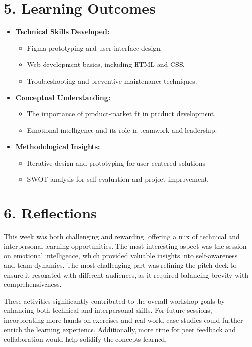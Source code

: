 \documentclass{article}
\begin{document}
\section*{5. Learning Outcomes}
\begin{itemize}
    \item \textbf{Technical Skills Developed:}
    \begin{itemize}
        \item Figma prototyping and user interface design.
        \item Web development basics, including HTML and CSS.
        \item Troubleshooting and preventive maintenance techniques.
    \end{itemize}
    \item \textbf{Conceptual Understanding:}
    \begin{itemize}
        \item The importance of product-market fit in product development.
        \item Emotional intelligence and its role in teamwork and leadership.
    \end{itemize}
    \item \textbf{Methodological Insights:}
    \begin{itemize}
        \item Iterative design and prototyping for user-centered solutions.
        \item SWOT analysis for self-evaluation and project improvement.
    \end{itemize}
\end{itemize}

\section*{6. Reflections}
This week was both challenging and rewarding, offering a mix of technical and interpersonal learning opportunities. The most interesting aspect was the session on emotional intelligence, which provided valuable insights into self-awareness and team dynamics. The most challenging part was refining the pitch deck to ensure it resonated with different audiences, as it required balancing brevity with comprehensiveness.

These activities significantly contributed to the overall workshop goals by enhancing both technical and interpersonal skills. For future sessions, incorporating more hands-on exercises and real-world case studies could further enrich the learning experience. Additionally, more time for peer feedback and collaboration would help solidify the concepts learned.
\end{document}
